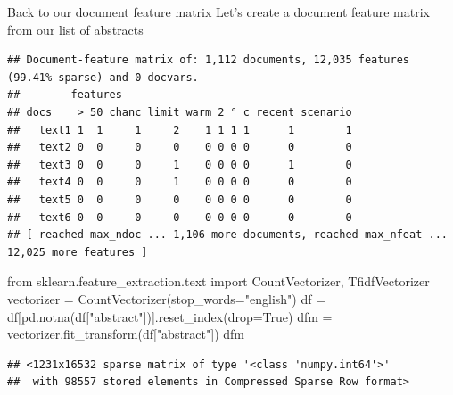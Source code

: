 \documentclass[
  10pt,
  ignorenonframetext,
  aspectratio=169]{beamer}
\newenvironment{Shaded}{\begin{snugshade}}{\end{snugshade}}
\newcommand{\AttributeTok}[1]{\textcolor[rgb]{0.80,0.80,0.80}{#1}}
\newcommand{\ConstantTok}[1]{\textcolor[rgb]{0.86,0.64,0.64}{\textbf{#1}}}
\newcommand{\FunctionTok}[1]{\textcolor[rgb]{0.94,0.94,0.56}{#1}}
\newcommand{\ImportTok}[1]{\textcolor[rgb]{0.80,0.80,0.80}{#1}}
\newcommand{\NormalTok}[1]{\textcolor[rgb]{0.80,0.80,0.80}{#1}}
\newcommand{\OperatorTok}[1]{\textcolor[rgb]{0.94,0.94,0.82}{#1}}
\newcommand{\OtherTok}[1]{\textcolor[rgb]{0.94,0.94,0.56}{#1}}
\newcommand{\SpecialCharTok}[1]{\textcolor[rgb]{0.86,0.64,0.64}{#1}}
\newcommand{\StringTok}[1]{\textcolor[rgb]{0.80,0.58,0.58}{#1}}
\newcommand{\VariableTok}[1]{\textcolor[rgb]{0.80,0.80,0.80}{#1}}
\begin{document}
\begin{frame}[fragile]{Back to our document feature matrix}
\protect\hypertarget{back-to-our-document-feature-matrix}{}
Let's create a document feature matrix from our list of abstracts

\scriptsize

\begin{Shaded}
\end{Shaded}

\begin{verbatim}
## Document-feature matrix of: 1,112 documents, 12,035 features (99.41% sparse) and 0 docvars.
##        features
## docs    > 50 chanc limit warm 2 ° c recent scenario
##   text1 1  1     1     2    1 1 1 1      1        1
##   text2 0  0     0     0    0 0 0 0      0        0
##   text3 0  0     0     1    0 0 0 0      1        0
##   text4 0  0     0     1    0 0 0 0      0        0
##   text5 0  0     0     0    0 0 0 0      0        0
##   text6 0  0     0     0    0 0 0 0      0        0
## [ reached max_ndoc ... 1,106 more documents, reached max_nfeat ... 12,025 more features ]
\end{verbatim}

\begin{Shaded}
\begin{Highlighting}[]
\ImportTok{from}\NormalTok{ sklearn.feature\_extraction.text }\ImportTok{import}\NormalTok{ CountVectorizer, TfidfVectorizer}
\NormalTok{vectorizer }\OperatorTok{=}\NormalTok{ CountVectorizer(stop\_words}\OperatorTok{=}\StringTok{"english"}\NormalTok{)}
\NormalTok{df }\OperatorTok{=}\NormalTok{ df[pd.notna(df[}\StringTok{"abstract"}\NormalTok{])].reset\_index(drop}\OperatorTok{=}\VariableTok{True}\NormalTok{)}
\NormalTok{dfm }\OperatorTok{=}\NormalTok{ vectorizer.fit\_transform(df[}\StringTok{"abstract"}\NormalTok{])}
\NormalTok{dfm}
\end{Highlighting}
\end{Shaded}

\begin{verbatim}
## <1231x16532 sparse matrix of type '<class 'numpy.int64'>'
##  with 98557 stored elements in Compressed Sparse Row format>
\end{verbatim}
\end{frame}
\end{document}
